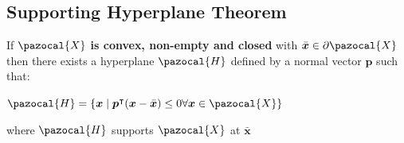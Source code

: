 \documentclass[english]{latex4ei/latex4ei_sheet}
\begin{document}
\begin{sectionbox}
	\subsection{Supporting Hyperplane Theorem}
	\vspace{0.3em}
	If $\pazocal{X}$ \textbf{is convex, non-empty and closed} with $\bar{\bm{x}} \in \partial\pazocal{X}$ then there exists a hyperplane $\pazocal{H}$ defined by a normal vector $\bm{p}$ such that:
	
	\begin{center}
		$\pazocal{H} = \{ \bm{x} \mid \bm{p}^\intercal(\bm{x} - \bar{\bm{x}}) \leq 0 \forall \bm{x} \in \pazocal{X} \}$
	\end{center}

	where $\pazocal{H}$ supports $\pazocal{X}$ at $\bar{\bm{x}}$

\end{sectionbox}
\end{document}
